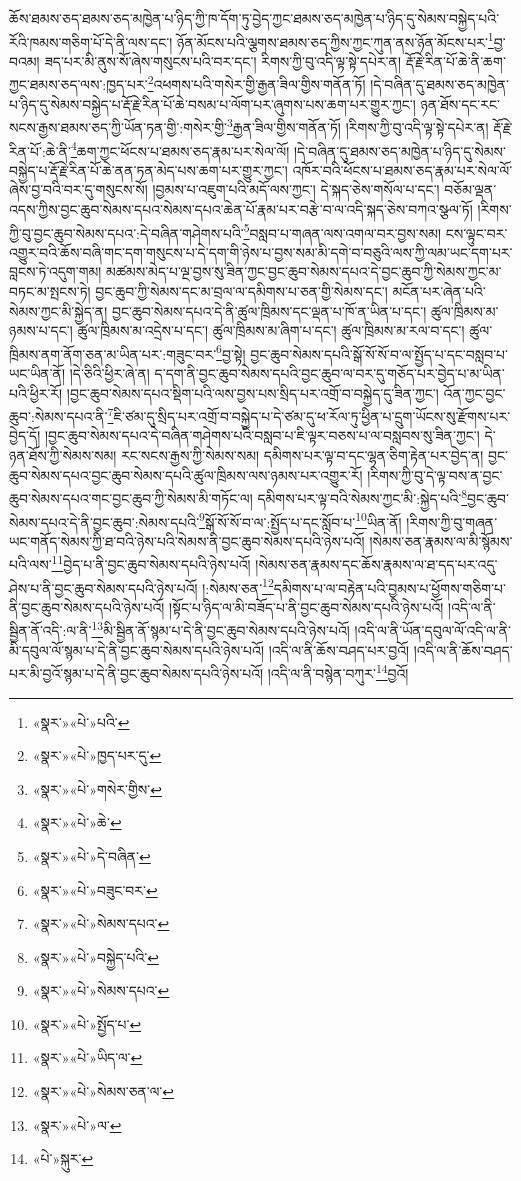 ཆོས་ཐམས་ཅད་ཐམས་ཅད་མཁྱེན་པ་ཉིད་ཀྱི་ཁ་དོག་ཏུ་བྱེད་ཀྱང་ཐམས་ཅད་མཁྱེན་པ་ཉིད་དུ་སེམས་བསྐྱེད་པའི་རོའི་ཁམས་གཅིག་པོ་དེ་ནི་ལས་དང་། ཉོན་མོངས་པའི་ལྕགས་ཐམས་ཅད་ཀྱིས་ཀྱང་ཀུན་ནས་ཉོན་མོངས་པར་\footnote{«སྣར་»«པེ་»པའི་}བྱ་བའམ། ཟད་པར་མི་ནུས་སོ་ཞེས་གསུངས་པའི་བར་དང་། རིགས་ཀྱི་བུ་འདི་ལྟ་སྟེ་དཔེར་ན། རྡོ་རྗེ་རིན་པོ་ཆེ་ནི་ཆག་ཀྱང་ཐམས་ཅད་ལས་:ཁྱད་པར་\footnote{«སྣར་»«པེ་»ཁྱད་པར་དུ་}འཕགས་པའི་གསེར་གྱི་རྒྱན་ཟིལ་གྱིས་གནོན་ཏོ། །དེ་བཞིན་དུ་ཐམས་ཅད་མཁྱེན་པ་ཉིད་དུ་སེམས་བསྐྱེད་པ་རྡོ་རྗེ་རིན་པོ་ཆེ་བསམ་པ་ལོག་པར་ཞུགས་པས་ཆག་པར་གྱུར་ཀྱང་། ཉན་ཐོས་དང་རང་སངས་རྒྱས་ཐམས་ཅད་ཀྱི་ཡོན་ཏན་གྱི་:གསེར་གྱི་\footnote{«སྣར་»«པེ་»གསེར་གྱིས་}རྒྱན་ཟིལ་གྱིས་གནོན་ཏོ། །རིགས་ཀྱི་བུ་འདི་ལྟ་སྟེ་དཔེར་ན། རྡོ་རྗེ་རིན་པོ་:ཆེ་ནི་\footnote{«སྣར་»«པེ་»ཆེ་}ཆག་ཀྱང་ཕོངས་པ་ཐམས་ཅད་རྣམ་པར་སེལ་ལོ། །དེ་བཞིན་དུ་ཐམས་ཅད་མཁྱེན་པ་ཉིད་དུ་སེམས་བསྐྱེད་པ་རྡོ་རྗེ་རིན་པོ་ཆེ་ནན་ཏན་མེད་པས་ཆག་པར་གྱུར་ཀྱང་། འཁོར་བའི་ཕོངས་པ་ཐམས་ཅད་རྣམ་པར་སེལ་ལོ་ཞེས་བྱ་བའི་བར་དུ་གསུངས་སོ། །བྱམས་པ་འཇུག་པའི་མདོ་ལས་ཀྱང་། དེ་སྐད་ཅེས་གསོལ་པ་དང་། བཅོམ་ལྡན་འདས་ཀྱིས་བྱང་ཆུབ་སེམས་དཔའ་སེམས་དཔའ་ཆེན་པོ་རྣམ་པར་བརྩེ་བ་ལ་འདི་སྐད་ཅེས་བཀའ་སྩལ་ཏོ། །རིགས་ཀྱི་བུ་བྱང་ཆུབ་སེམས་དཔའ་:དེ་བཞིན་གཤེགས་པའི་\footnote{«སྣར་»«པེ་»དེ་བཞིན་}བསླབ་པ་གཞན་ལས་འགལ་བར་བྱས་སམ། ངས་ལྟུང་བར་འགྱུར་བའི་ཆོས་བཞི་གང་དག་གསུངས་པ་དེ་དག་གི་ཉེས་པ་བྱས་སམ་མི་དགེ་བ་བཅུའི་ལས་ཀྱི་ལམ་ཡང་དག་པར་བླངས་ཏེ་འདུག་གམ། མཚམས་མེད་པ་ལྔ་བྱས་སུ་ཟིན་ཀྱང་བྱང་ཆུབ་སེམས་དཔའ་དེ་བྱང་ཆུབ་ཀྱི་སེམས་ཀྱང་མ་བཏང་མ་སྤངས་ཏེ། བྱང་ཆུབ་ཀྱི་སེམས་དང་མ་བྲལ་ལ་དམིགས་པ་ཅན་གྱི་སེམས་དང་། མངོན་པར་ཞེན་པའི་སེམས་ཀྱང་མི་སྐྱེད་ན། བྱང་ཆུབ་སེམས་དཔའ་དེ་ནི་ཚུལ་ཁྲིམས་དང་ལྡན་པ་ཁོ་ན་ཡིན་པ་དང་། ཚུལ་ཁྲིམས་མ་ཉམས་པ་དང་། ཚུལ་ཁྲིམས་མ་འདྲེས་པ་དང་། ཚུལ་ཁྲིམས་མ་ཞིག་པ་དང་། ཚུལ་ཁྲིམས་མ་རལ་བ་དང་། ཚུལ་ཁྲིམས་ནག་ནོག་ཅན་མ་ཡིན་པར་:གཟུང་བར་\footnote{«སྣར་»«པེ་»བཟུང་བར་}བྱ་སྟེ། བྱང་ཆུབ་སེམས་དཔའི་སྒོ་སོ་སོ་བ་ལ་སྤྱོད་པ་དང་བསླབ་པ་ཡང་ཡིན་ནོ། །དེ་ཅིའི་ཕྱིར་ཞེ་ན། ད་དག་ནི་བྱང་ཆུབ་སེམས་དཔའི་བྱང་ཆུབ་ལ་བར་དུ་གཅོད་པར་བྱེད་པ་མ་ཡིན་པའི་ཕྱིར་རོ། །བྱང་ཆུབ་སེམས་དཔའ་སྡིག་པའི་ལས་བྱས་པས་སྲིད་པར་འགྲོ་བ་བསྐྱེད་དུ་ཟིན་ཀྱང་། འོན་ཀྱང་བྱང་ཆུབ་:སེམས་དཔའ་ནི་\footnote{«སྣར་»«པེ་»སེམས་དཔའ་}ཇི་ཙམ་དུ་སྲིད་པར་འགྲོ་བ་བསྐྱེད་པ་དེ་ཙམ་དུ་ཕ་རོལ་ཏུ་ཕྱིན་པ་དྲུག་ཡོངས་སུ་རྫོགས་པར་བྱེད་དོ། །བྱང་ཆུབ་སེམས་དཔའ་དེ་བཞིན་གཤེགས་པའི་བསླབ་པ་ཇི་ལྟར་བཅས་པ་ལ་བསླབས་སུ་ཟིན་ཀྱང་། དེ་ཉན་ཐོས་ཀྱི་སེམས་སམ། རང་སངས་རྒྱས་ཀྱི་སེམས་སམ། དམིགས་པར་ལྟ་བ་དང་ལྷན་ཅིག་རྟེན་པར་བྱེད་ན། བྱང་ཆུབ་སེམས་དཔའ་བྱང་ཆུབ་སེམས་དཔའི་ཚུལ་ཁྲིམས་ལས་ཉམས་པར་འགྱུར་རོ། །རིགས་ཀྱི་བུ་དེ་ལྟ་བས་ན་བྱང་ཆུབ་སེམས་དཔའ་གང་བྱང་ཆུབ་ཀྱི་སེམས་མི་གཏོང་ལ། དམིགས་པར་ལྟ་བའི་སེམས་ཀྱང་མི་:སྐྱེད་པའི་\footnote{«སྣར་»«པེ་»བསྐྱེད་པའི་}བྱང་ཆུབ་སེམས་དཔའ་དེ་ནི་བྱང་ཆུབ་:སེམས་དཔའི་\footnote{«སྣར་»«པེ་»སེམས་དཔའ་}སྒོ་སོ་སོ་བ་ལ་:སྤྱོད་པ་དང་སློབ་པ་\footnote{«སྣར་»«པེ་»སྤྱོད་པ་}ཡིན་ནོ། །རིགས་ཀྱི་བུ་གཞན་ཡང་གནོད་སེམས་ཀྱི་ཐ་བའི་ཉེས་པའི་སེམས་ནི་བྱང་ཆུབ་སེམས་དཔའི་ཉེས་པའོ། །སེམས་ཅན་རྣམས་ལ་མི་སྙོམས་པའི་ལས་\footnote{«སྣར་»«པེ་»ཡིད་ལ་}བྱེད་པ་ནི་བྱང་ཆུབ་སེམས་དཔའི་ཉེས་པའོ། །སེམས་ཅན་རྣམས་དང་ཆོས་རྣམས་ལ་ཐ་དད་པར་འདུ་ཤེས་པ་ནི་བྱང་ཆུབ་སེམས་དཔའི་ཉེས་པའོ། །:སེམས་ཅན་\footnote{«སྣར་»«པེ་»སེམས་ཅན་ལ་}དམིགས་པ་ལ་བརྟེན་པའི་བྱམས་པ་ཕྱོགས་གཅིག་པ་ནི་བྱང་ཆུབ་སེམས་དཔའི་ཉེས་པའོ། །སྟོང་པ་ཉིད་ལ་མི་བཟོད་པ་ནི་བྱང་ཆུབ་སེམས་དཔའི་ཉེས་པའོ། །འདི་ལ་ནི་སྦྱིན་ནོ་འདི་:ལ་ནི་\footnote{«སྣར་»«པེ་»ལ་}མི་སྦྱིན་ནོ་སྙམ་པ་དེ་ནི་བྱང་ཆུབ་སེམས་དཔའི་ཉེས་པའོ། །འདི་ལ་ནི་ཡོན་དབུལ་ལོ་འདི་ལ་ནི་མི་དབུལ་ལོ་སྙམ་པ་དེ་ནི་བྱང་ཆུབ་སེམས་དཔའི་ཉེས་པའོ། །འདི་ལ་ནི་ཆོས་བཤད་པར་བྱའོ། །འདི་ལ་ནི་ཆོས་བཤད་པར་མི་བྱའོ་སྙམ་པ་དེ་ནི་བྱང་ཆུབ་སེམས་དཔའི་ཉེས་པའོ། །འདི་ལ་ནི་བསྙེན་བཀུར་\footnote{«པེ་»སྐུར་}བྱའོ། 